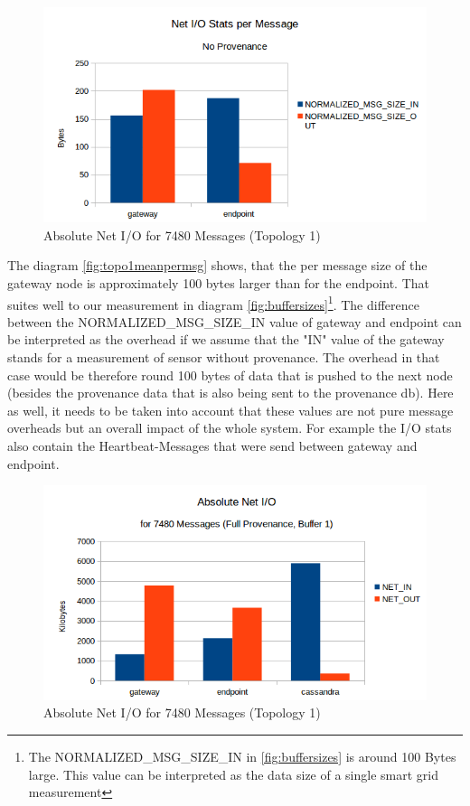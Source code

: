 \begin{figure}[H]
	\center
	\includegraphics[width=\textwidth]{figures/overheaddiagram7.png}
	\caption{Absolute Net I/O for 7480 Messages (Topology 1)}
	\label{fig:topo1absolutenoprov}
\end{figure}

The diagram \ref{fig:topo1meanpermsg} shows, that the per message size of the gateway node is approximately 100 bytes larger than for the endpoint. That suites well to our measurement in diagram \ref{fig:buffersizes}\footnote{The NORMALIZED\_MSG\_SIZE\_IN in \ref{fig:buffersizes} is around 100 Bytes large. This value can be interpreted as the data size of a single smart grid measurement}. The difference between the NORMALIZED\_MSG\_SIZE\_IN value of gateway and endpoint can be interpreted as the overhead if we assume that the "IN" value of the gateway stands for a measurement of sensor without provenance. The overhead in that case would be therefore round 100 bytes of data that is pushed to the next node (besides the provenance data that is also being sent to the provenance db). Here as well, it needs to be taken into account that these values are not pure message overheads but an overall impact of the whole system. For example the I/O stats also contain the Heartbeat-Messages that were send between gateway and endpoint.

\begin{figure}[H]
	\center
	\includegraphics[width=\textwidth]{figures/overheaddiagram4.png}
	\caption{Absolute Net I/O for 7480 Messages (Topology 1)}
	\label{fig:topo1absoluteprov}
\end{figure}

